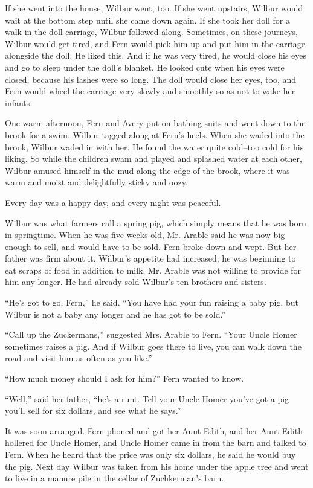 \documentclass[a4paper, oneside]{book}
\begin{document}
If she went into the house, Wilbur went, too. If she went upstairs,
Wilbur would wait at the bottom step until she came down again. If
she took her doll for a walk in the doll carriage, Wilbur followed
along. Sometimes, on these journeys, Wilbur would get tired, and             
Fern would pick him up and put him in the carriage alongside the
doll. He liked this. And if he was very tired, he would close his eyes
and go to sleep under the doll's blanket. He looked cute when his 
eyes were closed, because his lashes were so long. The doll would 
close her eyes, too, and Fern would wheel the carriage very slowly
and smoothly so as not to wake her infants. 

One warm afternoon, Fern and Avery put on bathing suits and
went down to the brook for a swim. Wilbur tagged along at Fern's
heels. When she waded into the brook, Wilbur waded in with her.
He found the water quite cold--too cold for his liking. So while the
children swam and played and splashed water at each other,
Wilbur amused himself in the mud along the edge of the brook,
where it was warm and moist and delightfully sticky and oozy. 

Every day was a happy day, and every night was peaceful.

 Wilbur was what farmers call a spring pig, which simply means
that he was born in springtime. When he was five weeks old, Mr.
Arable said he was now big enough to sell, and would have to be
sold. Fern broke down and wept. But her father was firm about it.
Wilbur's appetite had increased; he was beginning to eat scraps of
food in addition to milk. Mr. Arable was not willing to provide for
him any longer. He had already sold Wilbur's ten brothers and
sisters. 

``He's got to go, Fern,'' he said. ``You have had your fun raising a
baby pig, but Wilbur is not a baby any longer and he has got to be
sold.'' 

 ``Call up the Zuckermans,'' suggested Mrs. Arable to Fern. ``Your 
Uncle Homer sometimes raises a pig. And if Wilbur goes there to
live, you can walk down the road and visit him as often as you like.'' 

``How much money should I ask for him?'' Fern wanted to know.

 ``Well,'' said her father, ``he's a runt. Tell your Uncle Homer you've
got a pig you'll sell for six dollars, and see what he says.''

 It was soon arranged. Fern phoned and got her Aunt Edith, and
her Aunt Edith hollered for Uncle Homer, and Uncle Homer came
in from the barn and talked to Fern. When he heard that the price
was only six dollars, he said he would buy the pig. Next day Wilbur
was taken from his home under the apple tree and went to live in a
manure pile in the cellar of Zuchkerman's barn. 
\end{document}
